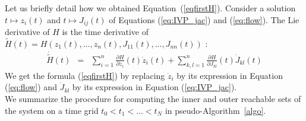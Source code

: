 \documentclass{sig-alternate-05-2015}
\begin{document}
Let us briefly detail how we obtained Equation~(\ref{eqfirstH}).
Consider a solution $t \mapsto z_i(t)$ and $t \mapsto J_{ij}(t)$ of
Equations (\ref{eq:IVP_jac}) and (\ref{eq:flow}). The Lie derivative of $H$
is
the time derivative of $\tilde{H}(t)=H(z_1(t),\ldots,z_n(t),J_{11}(t),\ldots,J_{nn}(t))$ : 
$$\begin{array}{rcl}
\dot{\tilde{H}}(t) & = & \sum\limits_{i=1}^{n} \frac{\partial H}{\partial z_i}(t)
\dot{z}_i(t)+\sum\limits_{k,l=1}^n \frac{\partial H}{\partial J_{kl}}(t) \dot{J}_{kl}(t)
\end{array}$$
We get the formula (\ref{eqfirstH}) by 
replacing $\dot{z}_i$ by its expression in Equation (\ref{eq:flow}) and
$\dot{J}_{kl}$ by its expression in Equation (\ref{eq:IVP_jac}). \\

We summarize the procedure for computing the inner and outer reachable sets of the system 
on a time grid $t_0 < t_1 < \ldots < t_N$ in pseudo-Algorithm~\ref{algo}.


\end{document}

